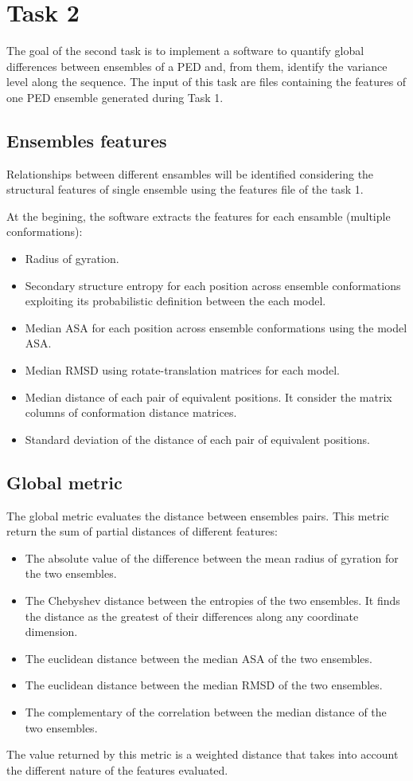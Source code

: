 \section{Task 2}\label{sec:task2}

The goal of the second task is to implement a software to quantify global differences between ensembles of a PED and, from them, identify the variance level along the sequence. The input of this task are files containing the features of one PED ensemble generated during Task 1.

\subsection{Ensembles features}
Relationships between different ensambles will be identified considering the structural features of single ensemble using the features file of the task 1.

At the begining, the software extracts the features for each ensamble (multiple conformations):
\begin{itemize}
\item Radius of gyration. %
\item Secondary structure entropy for each position across ensemble conformations exploiting its probabilistic definition between the each model.
\item Median ASA for each position across ensemble conformations using the model ASA.
\item Median RMSD using rotate-translation matrices for each model.
\item Median distance of each pair of equivalent positions. It consider the matrix columns of conformation distance matrices.
\item Standard deviation of the distance of each pair of equivalent positions.
\end{itemize}


\subsection{Global metric}
The global metric evaluates the distance between ensembles pairs. 
This metric return the sum of partial distances of different features:
\begin{itemize}
\item The absolute value of the difference between the mean radius of gyration for the two ensembles.
\item The Chebyshev distance between the entropies of the two ensembles. It finds the distance as the greatest of their differences along any coordinate dimension.
\item The euclidean distance between the median ASA of the two ensembles.
\item The euclidean distance between the median RMSD of the two ensembles.
\item The complementary of the correlation between the median distance of the two ensembles.
\end{itemize}
The value returned by this metric is a weighted distance that takes into account the different nature of the features evaluated. %

